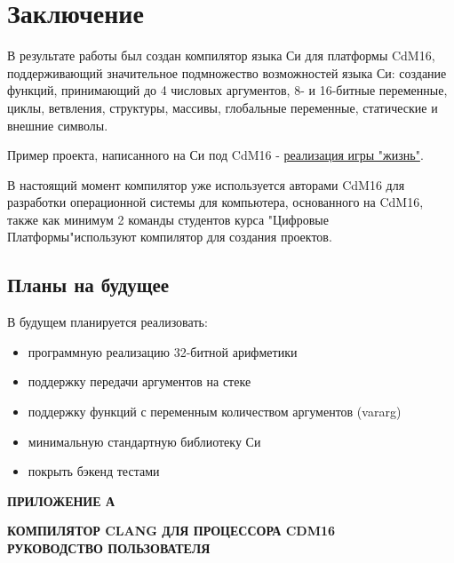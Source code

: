 \documentclass[a4paper,14pt]{extarticle}
\begin{document}
\clearpage
\section{Заключение}

В результате работы был создан компилятор языка Си для платформы CdM16, поддерживающий значительное подмножество возможностей языка Си: создание функций, принимающий до 4 числовых аргументов, 8- и 16-битные переменные, циклы, ветвления, структуры, массивы, глобальные переменные, статические и внешние символы.

Пример проекта, написанного на Си под CdM16 - \href{https://github.com/leadpogrommer/llvm-project-cdm/tree/backend/cdm/llvm/test_cdm/life_multifile}{реализация игры "жизнь"}.

В настоящий момент компилятор уже используется авторами CdM16 для разработки операционной системы для компьютера, основанного на CdM16\cite{cdm:coconut}, также как минимум 2 команды студентов курса "Цифровые Платформы"\allowbreak используют компилятор для создания проектов.

\subsection{Планы на будущее}

В будущем планируется реализовать:
\begin{itemize}
	\item программную реализацию 32-битной арифметики
	\item поддержку передачи аргументов на стеке
	\item поддержку функций с переменным количеством аргументов (vararg)
	\item минимальную стандартную библиотеку Си
	\item покрыть бэкенд тестами
\end{itemize}


\pagebreak
\printbibliography
{}


\newpage
\begin{center}
	\textbf{\large ПРИЛОЖЕНИЕ А}
\end{center}
\vspace*{\fill}
	\begin{center}
		\textbf{\large КОМПИЛЯТОР CLANG ДЛЯ ПРОЦЕССОРА CDM16\\РУКОВОДСТВО ПОЛЬЗОВАТЕЛЯ}
	\end{center}
\vspace*{\fill}
\newpage
\setcounter{section}{0}
\end{document}
